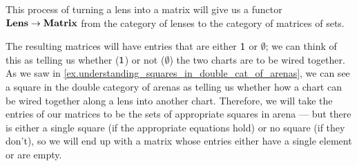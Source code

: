 \documentclass[DynamicalBook]{subfiles}
\begin{document}
This process of turning a lens into a matrix will give us a functor $\textbf{Lens}
\to \textbf{Matrix}$ from the category of lenses to the category of matrices of
sets.

The resulting matrices will have entries that are either $\mathsf{1}$ or
$\emptyset$; we can think of this as telling us whether ($\mathsf{1}$) or not ($\emptyset$) the two charts
are to be wired together. As we saw in
\cref{ex.understanding_squares_in_double_cat_of_arenas}, we can see a square in the double
category of arenas as telling us whether how a chart can be wired together along
a lens into another chart. Therefore, we will take the entries of our matrices
to be the sets of appropriate squares in arena --- but there is either a single
square (if the appropriate equations hold) or no square (if they don't), so we
will end up with a matrix whose entries either have a single element or are empty.
\end{document}
